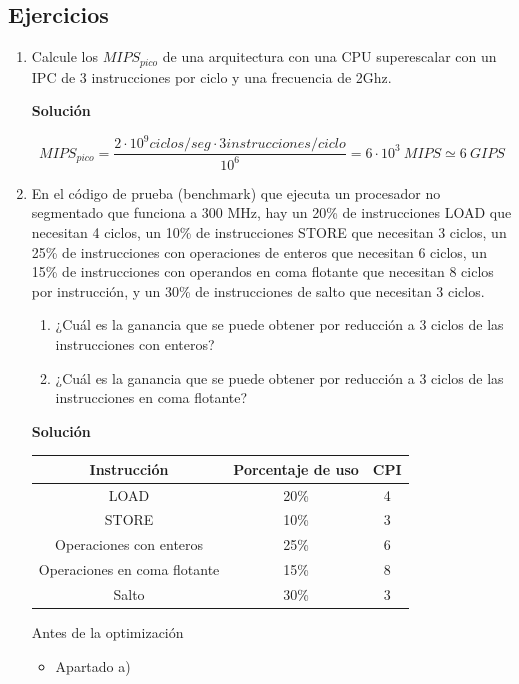 \documentclass[12pt,spanish]{article}
\newenvironment{solution}{
	\par
	\textbf{Solución}
	\par
	\begin{center}
}
{
	\end{center}
}
\begin{document}
\subsection{Ejercicios}
\begin{enumerate}
\item Calcule los $MIPS_{pico}$ de una arquitectura con una CPU superescalar con un IPC de 3 instrucciones por ciclo y una frecuencia de 2Ghz.
\begin{solution}
\[ MIPS_{pico}=\frac{2 \cdot 10^9 ciclos/seg \cdot 3 instrucciones/ciclo}{10^6}=6 \cdot 10^3 \ MIPS \simeq 6 \ GIPS \]
\end{solution}
\item En el  código de  prueba  (benchmark) que  ejecuta un procesador  no  segmentado  que  funciona a 300  MHz,  hay  un  20\%  de  instrucciones  LOAD  que  necesitan  4  ciclos,  un  10\%  de  instrucciones  STORE  que necesitan  3  ciclos,  un  25\%  de  instrucciones  con  operaciones  de  enteros  que  necesitan  6  ciclos,  un  15\%  de instrucciones  con  operandos  en  coma  flotante  que  necesitan  8  ciclos  por  instrucción,  y  un  30\%  de instrucciones de salto que necesitan 3 ciclos. 
\begin{enumerate}
\item ¿Cuál es la ganancia que se puede obtener por reducción a 3 ciclos de las instrucciones con enteros?
\item ¿Cuál es la ganancia que se puede obtener por reducción a 3 ciclos de las instrucciones en coma flotante?
\end{enumerate}
\begin{solution}
\begin{table}[H]
\centering
\begin{tabular}{|c|c|c|}
\hline
\textbf{Instrucción} & \textbf{Porcentaje de uso} & \textbf{CPI} \\
\hline
LOAD & 20\% & 4 \\
\hline
STORE & 10\% & 3 \\
\hline
Operaciones con enteros & 25\% & 6 \\
\hline
Operaciones en coma flotante & 15\% & 8 \\
\hline
Salto & 30\% & 3 \\
\hline
\end{tabular}
\par
\bigskip
Antes de la optimización
\end{table}
\newpage
\begin{itemize}
\item Apartado a)

\end{itemize}
\end{solution}
\end{enumerate}
\end{document}
